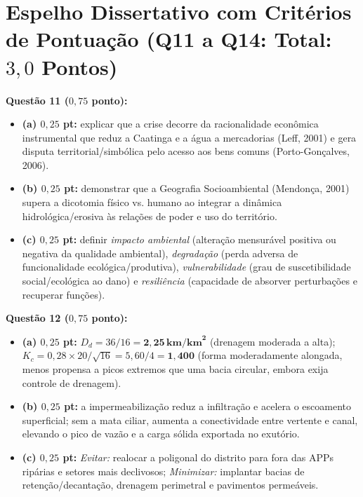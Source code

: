 \section*{Espelho Dissertativo com Critérios de Pontuação (Q11 a Q14: Total: $3{,}0$ Pontos)}

\begin{boxGabarito}
  \textbf{Questão 11 ($0{,}75$ ponto):}
  \begin{itemize}[leftmargin=1.5em, itemsep=2.5pt]
    \item \textbf{(a) $0{,}25$ pt:} explicar que a crise decorre da racionalidade econômica instrumental que reduz a Caatinga e a água a mercadorias (Leff, 2001) e gera disputa territorial/simbólica pelo acesso aos bens comuns (Porto-Gonçalves, 2006).
    \item \textbf{(b) $0{,}25$ pt:} demonstrar que a Geografia Socioambiental (Mendonça, 2001) supera a dicotomia físico vs. humano ao integrar a dinâmica hidrológica/erosiva às relações de poder e uso do território.
    \item \textbf{(c) $0{,}25$ pt:} definir \emph{impacto ambiental} (alteração mensurável positiva ou negativa da qualidade ambiental), \emph{degradação} (perda adversa de funcionalidade ecológica/produtiva), \emph{vulnerabilidade} (grau de suscetibilidade social/ecológica ao dano) e \emph{resiliência} (capacidade de absorver perturbações e recuperar funções).
  \end{itemize}
  \vspace{4pt}
  \textbf{Questão 12 ($0{,}75$ ponto):}
  \begin{itemize}[leftmargin=1.5em, itemsep=2.5pt]
    \item \textbf{(a) $0{,}25$ pt:} $D_d = 36 / 16 = \mathbf{2{,}25\,\text{km/km}^2}$ (drenagem moderada a alta); $K_c = 0{,}28 \times 20 / \sqrt{16} = 5{,}60 / 4 = \mathbf{1{,}400}$ (forma moderadamente alongada, menos propensa a picos extremos que uma bacia circular, embora exija controle de drenagem).
    \item \textbf{(b) $0{,}25$ pt:} a impermeabilização reduz a infiltração e acelera o escoamento superficial; sem a mata ciliar, aumenta a conectividade entre vertente e canal, elevando o pico de vazão e a carga sólida exportada no exutório.
    \item \textbf{(c) $0{,}25$ pt:} \emph{Evitar:} realocar a poligonal do distrito para fora das APPs ripárias e setores mais declivosos; \emph{Minimizar:} implantar bacias de retenção/decantação, drenagem perimetral e pavimentos permeáveis.
  \end{itemize}
\end{boxGabarito}

